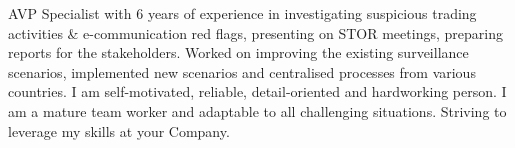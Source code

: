 AVP Specialist with 6 years of experience in investigating suspicious trading activities \& e-communication red flags, presenting on STOR meetings, preparing reports for the stakeholders.
Worked on improving the existing surveillance scenarios, implemented new scenarios and centralised processes from various countries.
I am self-motivated, reliable, detail-oriented and hardworking person.
I am a mature team worker and adaptable to all challenging situations.
Striving to leverage my skills at your Company.

